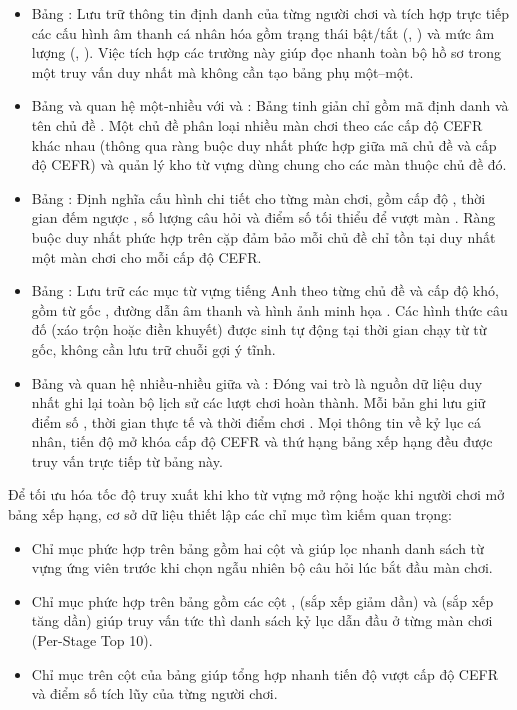 \begin{itemize}
    \item Bảng : Lưu trữ thông tin định danh của từng người chơi và tích hợp trực tiếp các cấu hình âm thanh cá nhân hóa gồm trạng thái bật/tắt (, ) và mức âm lượng (, ). Việc tích hợp các trường này giúp đọc nhanh toàn bộ hồ sơ trong một truy vấn duy nhất mà không cần tạo bảng phụ một--một.
    \item Bảng  và quan hệ một‑nhiều với  và : Bảng  tinh giản chỉ gồm mã định danh  và tên chủ đề . Một chủ đề phân loại nhiều màn chơi theo các cấp độ CEFR khác nhau (thông qua ràng buộc duy nhất phức hợp giữa mã chủ đề và cấp độ CEFR) và quản lý kho từ vựng dùng chung cho các màn thuộc chủ đề đó.
    \item Bảng : Định nghĩa cấu hình chi tiết cho từng màn chơi, gồm cấp độ , thời gian đếm ngược , số lượng câu hỏi  và điểm số tối thiểu để vượt màn . Ràng buộc duy nhất phức hợp trên cặp  đảm bảo mỗi chủ đề chỉ tồn tại duy nhất một màn chơi cho mỗi cấp độ CEFR.
    \item Bảng : Lưu trữ các mục từ vựng tiếng Anh theo từng chủ đề và cấp độ khó, gồm từ gốc , đường dẫn âm thanh  và hình ảnh minh họa . Các hình thức câu đố (xáo trộn hoặc điền khuyết) được sinh tự động tại thời gian chạy từ từ gốc, không cần lưu trữ chuỗi gợi ý tĩnh.
    \item Bảng  và quan hệ nhiều‑nhiều giữa  và : Đóng vai trò là nguồn dữ liệu duy nhất ghi lại toàn bộ lịch sử các lượt chơi hoàn thành. Mỗi bản ghi lưu giữ điểm số , thời gian thực tế  và thời điểm chơi . Mọi thông tin về kỷ lục cá nhân, tiến độ mở khóa cấp độ CEFR và thứ hạng bảng xếp hạng đều được truy vấn trực tiếp từ bảng này.
\end{itemize}

Để tối ưu hóa tốc độ truy xuất khi kho từ vựng mở rộng hoặc khi người chơi mở bảng xếp hạng, cơ sở dữ liệu thiết lập các chỉ mục tìm kiếm quan trọng:

\begin{itemize}
    \item Chỉ mục phức hợp trên bảng  gồm hai cột  và  giúp lọc nhanh danh sách từ vựng ứng viên trước khi chọn ngẫu nhiên bộ câu hỏi lúc bắt đầu màn chơi.
    \item Chỉ mục phức hợp trên bảng  gồm các cột ,  (sắp xếp giảm dần) và  (sắp xếp tăng dần) giúp truy vấn tức thì danh sách kỷ lục dẫn đầu ở từng màn chơi (Per-Stage Top 10).
    \item Chỉ mục trên cột  của bảng  giúp tổng hợp nhanh tiến độ vượt cấp độ CEFR và điểm số tích lũy của từng người chơi.
\end{itemize}

